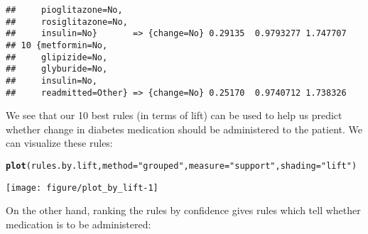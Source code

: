 \documentclass{article}\usepackage[]{graphicx}\usepackage[]{color}
\makeatletter
\def\maxwidth{ %
  \ifdim\Gin@nat@width>\linewidth
    \linewidth
  \else
    \Gin@nat@width
  \fi
}
\newcommand{\hlstr}[1]{\textcolor[rgb]{0.192,0.494,0.8}{#1}}%
\newcommand{\hlstd}[1]{\textcolor[rgb]{0.345,0.345,0.345}{#1}}%
\newcommand{\hlkwc}[1]{\textcolor[rgb]{0.333,0.667,0.333}{#1}}%
\newcommand{\hlkwd}[1]{\textcolor[rgb]{0.737,0.353,0.396}{\textbf{#1}}}%
\newenvironment{kframe}{%
 \def\at@end@of@kframe{}%
 \ifinner\ifhmode%
  \def\at@end@of@kframe{\end{minipage}}%
  \begin{minipage}{\columnwidth}%
 \fi\fi%
 \def\FrameCommand##1{\hskip\@totalleftmargin \hskip-\fboxsep
 \colorbox{shadecolor}{##1}\hskip-\fboxsep
     \hskip-\linewidth \hskip-\@totalleftmargin \hskip\columnwidth}%
 \MakeFramed {\advance\hsize-\width
   \@totalleftmargin\z@ \linewidth\hsize
   \@setminipage}}%
 {\par\unskip\endMakeFramed%
 \at@end@of@kframe}
\newenvironment{knitrout}{}{} %
\makeatother
\begin{document}
\begin{knitrout}
\begin{kframe}
\begin{verbatim}
##     pioglitazone=No,                                            
##     rosiglitazone=No,                                           
##     insulin=No}       => {change=No} 0.29135  0.9793277 1.747707
## 10 {metformin=No,                                               
##     glipizide=No,                                               
##     glyburide=No,                                               
##     insulin=No,                                                 
##     readmitted=Other} => {change=No} 0.25170  0.9740712 1.738326
\end{verbatim}
\end{kframe}
\end{knitrout}

We see that our \num{10} best rules (in terms of lift) can be used to help us
predict whether change in diabetes medication should be administered to the
patient.  We can visualize these rules:

\begin{knitrout}
\color{fgcolor}\begin{kframe}
\begin{alltt}
\hlkwd{plot}\hlstd{(rules.by.lift,} \hlkwc{method}\hlstd{=}\hlstr{"grouped"}\hlstd{,} \hlkwc{measure}\hlstd{=}\hlstr{"support"}\hlstd{,} \hlkwc{shading}\hlstd{=}\hlstr{"lift"}\hlstd{)}
\end{alltt}
\end{kframe}

{\centering \texttt{[image: figure/plot\_by\_lift-1]} 

}



\end{knitrout}

On the other hand, ranking the rules by confidence gives rules which
tell whether medication is to be administered:
\end{document}
